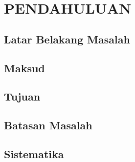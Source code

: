 \chapter{PENDAHULUAN}

\section{Latar Belakang Masalah}



\section{Maksud}

\section{Tujuan}

\section{Batasan Masalah}

\section{Sistematika}